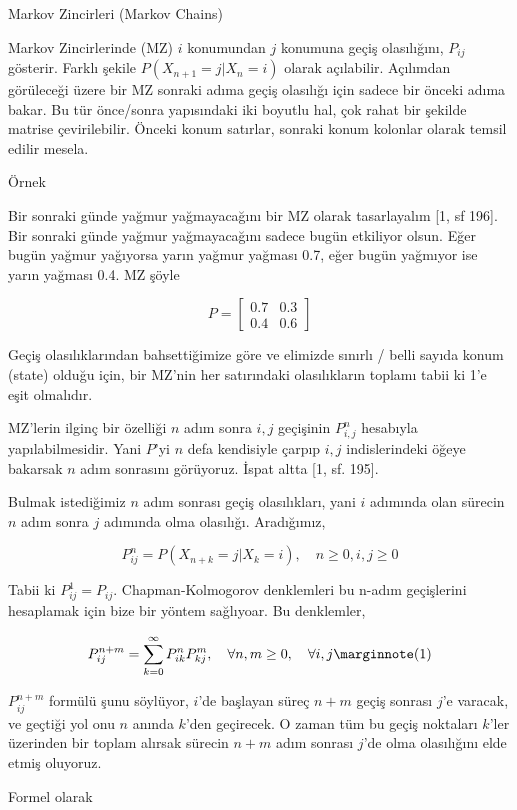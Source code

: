 \documentclass[12pt,fleqn]{article}\usepackage{../../common}
\begin{document}
Markov Zincirleri (Markov Chains)

Markov Zincirlerinde (MZ) $i$ konumundan $j$ konumuna geçiş olasılığını,
$P_{ij}$ gösterir. Farklı şekile $P(X_{n+1} = j | X_{n} = i)$ olarak
açılabilir. Açılımdan görüleceği üzere bir MZ sonraki adıma geçiş olasılığı için
sadece bir önceki adıma bakar. Bu tür önce/sonra yapısındaki iki boyutlu hal,
çok rahat bir şekilde matrise çevirilebilir. Önceki konum satırlar, sonraki
konum kolonlar olarak temsil edilir mesela.

Örnek

Bir sonraki günde yağmur yağmayacağını bir MZ olarak tasarlayalım [1, sf 196].
Bir sonraki günde yağmur yağmayacağını sadece bugün etkiliyor olsun. Eğer bugün
yağmur yağıyorsa yarın yağmur yağması 0.7, eğer bugün yağmıyor ise yarın
yağması 0.4. MZ şöyle

$$ 
P =
\left[\begin{array}{cc}
0.7 & 0.3 \\
0.4 & 0.6
\end{array}\right]
$$

Geçiş olasılıklarından bahsettiğimize göre ve elimizde sınırlı / belli sayıda
konum (state) olduğu için, bir MZ'nin her satırındaki olasılıkların toplamı
tabii ki 1'e eşit olmalıdır.

MZ'lerin ilginç bir özelliği $n$ adım sonra $i,j$ geçişinin $P_{i,j}^n$
hesabıyla yapılabilmesidir. Yani $P$'yi $n$ defa kendisiyle çarpıp $i,j$
indislerindeki öğeye bakarsak $n$ adım sonrasını görüyoruz. İspat altta [1, sf. 195].

Bulmak istediğimiz $n$ adım sonrası geçiş olasılıkları, yani $i$ adımında olan
sürecin $n$ adım sonra $j$ adımında olma olasılığı. Aradığımız,

$$
P_{ij}^n = P ( X_{n+k} = j | X_k = i ), \quad n \ge 0, i,j \ge 0
$$

Tabii ki $P_{ij}^1 = P_{ij}$. Chapman-Kolmogorov denklemleri bu n-adım
geçişlerini hesaplamak için bize bir yöntem sağlıyoar. Bu denklemler,

$$
P_{ij}^{n+m} = \sum _{k=0}^{\infty} P_{ik}^n P_{kj}^m,
\quad \forall n,m \ge 0, \quad \forall i,j
\mlabel{1}
$$

$P_{ij}^{n+m}$ formülü şunu söylüyor, $i$'de başlayan süreç $n+m$ geçiş sonrası
$j$'e varacak, ve geçtiği yol onu $n$ anında $k$'den geçirecek. O zaman tüm bu
geçiş noktaları $k$'ler üzerinden bir toplam alırsak sürecin $n+m$ adım sonrası
$j$'de olma olasılığını elde etmiş oluyoruz.

Formel olarak 
\end{document}
